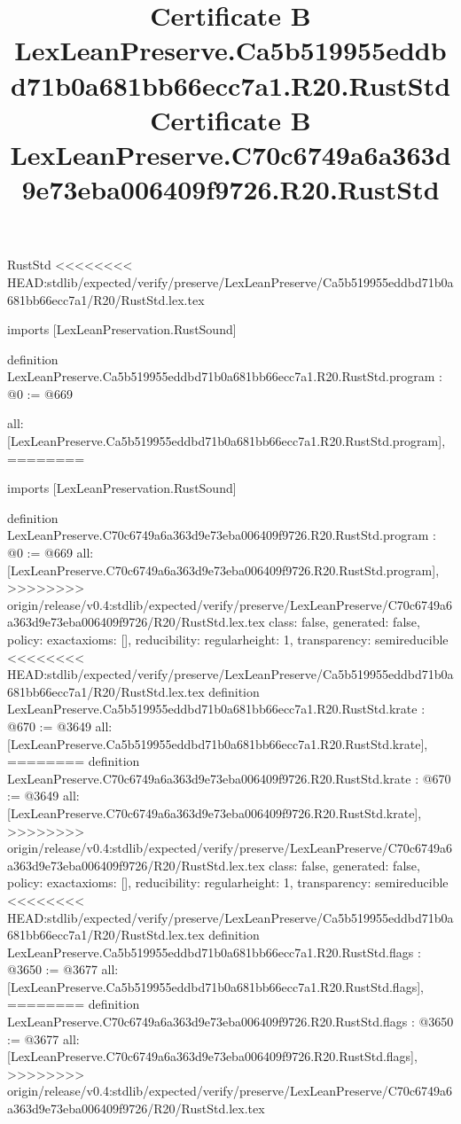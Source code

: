 \begin{lexlean}{RustStd}
<<<<<<<< HEAD:stdlib/expected/verify/preserve/LexLeanPreserve/Ca5b519955eddbd71b0a681bb66ecc7a1/R20/RustStd.lex.tex
\title{Certificate B LexLeanPreserve.Ca5b519955eddbd71b0a681bb66ecc7a1.R20.RustStd}
\begin{coremodule}
imports [LexLeanPreservation.RustSound]

definition LexLeanPreserve.Ca5b519955eddbd71b0a681bb66ecc7a1.R20.RustStd.program : @0 := @669 {
  all: [LexLeanPreserve.Ca5b519955eddbd71b0a681bb66ecc7a1.R20.RustStd.program],
========
\title{Certificate B LexLeanPreserve.C70c6749a6a363d9e73eba006409f9726.R20.RustStd}
\begin{coremodule}
imports [LexLeanPreservation.RustSound]

definition LexLeanPreserve.C70c6749a6a363d9e73eba006409f9726.R20.RustStd.program : @0 := @669 {
  all: [LexLeanPreserve.C70c6749a6a363d9e73eba006409f9726.R20.RustStd.program],
>>>>>>>> origin/release/v0.4:stdlib/expected/verify/preserve/LexLeanPreserve/C70c6749a6a363d9e73eba006409f9726/R20/RustStd.lex.tex
  class: false,
  generated: false,
  policy: exact{axioms: []},
  reducibility: regular{height: 1},
  transparency: semireducible
}
<<<<<<<< HEAD:stdlib/expected/verify/preserve/LexLeanPreserve/Ca5b519955eddbd71b0a681bb66ecc7a1/R20/RustStd.lex.tex
definition LexLeanPreserve.Ca5b519955eddbd71b0a681bb66ecc7a1.R20.RustStd.krate : @670 := @3649 {
  all: [LexLeanPreserve.Ca5b519955eddbd71b0a681bb66ecc7a1.R20.RustStd.krate],
========
definition LexLeanPreserve.C70c6749a6a363d9e73eba006409f9726.R20.RustStd.krate : @670 := @3649 {
  all: [LexLeanPreserve.C70c6749a6a363d9e73eba006409f9726.R20.RustStd.krate],
>>>>>>>> origin/release/v0.4:stdlib/expected/verify/preserve/LexLeanPreserve/C70c6749a6a363d9e73eba006409f9726/R20/RustStd.lex.tex
  class: false,
  generated: false,
  policy: exact{axioms: []},
  reducibility: regular{height: 1},
  transparency: semireducible
}
<<<<<<<< HEAD:stdlib/expected/verify/preserve/LexLeanPreserve/Ca5b519955eddbd71b0a681bb66ecc7a1/R20/RustStd.lex.tex
definition LexLeanPreserve.Ca5b519955eddbd71b0a681bb66ecc7a1.R20.RustStd.flags : @3650 := @3677 {
  all: [LexLeanPreserve.Ca5b519955eddbd71b0a681bb66ecc7a1.R20.RustStd.flags],
========
definition LexLeanPreserve.C70c6749a6a363d9e73eba006409f9726.R20.RustStd.flags : @3650 := @3677 {
  all: [LexLeanPreserve.C70c6749a6a363d9e73eba006409f9726.R20.RustStd.flags],
>>>>>>>> origin/release/v0.4:stdlib/expected/verify/preserve/LexLeanPreserve/C70c6749a6a363d9e73eba006409f9726/R20/RustStd.lex.tex
}}}
\end{coremodule}}
\end{coremodule}
\end{lexlean}
